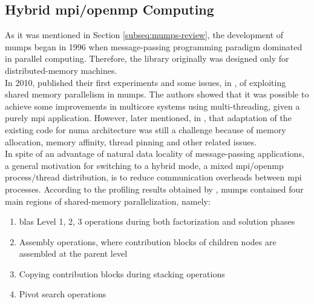\subsection{Hybrid \acrshort{mpi}/\acrshort{openmp} Computing}

\label{subseq:mpi-openmp}


As it was mentioned in Section \ref{subseq:mumps-review}, the development of \acrshort{mumps} began in 1996 when message-passing programming paradigm dominated in parallel computing. Therefore, the library originally was designed only for distributed-memory machines.\\

In 2010,  \citeauthor{chowdhury2010some} published their first experiments and some issues, in \cite{chowdhury2010some}, of exploiting shared memory parallelism in \acrshort{mumps}. The authors showed that it was possible to achieve some improvements in multicore systems using multi-threading, given a purely \acrshort{mpi} application. However, later \citeauthor{l2013introduction} mentioned, in \cite{l2013introduction}, that adaptation of the existing code for \acrshort{numa} architecture was still a challenge because of memory allocation, memory affinity, thread pinning and other related issues.\\


In spite of an advantage of natural data locality of message-passing applications, a general motivation for switching to a hybrid mode, a mixed \acrshort{mpi}/\acrshort{openmp} process/thread distribution, is to reduce communication overheads between \acrshort{mpi} processes. According to the profiling results obtained by \citeauthor{chowdhury2010some}, \acrshort{mumps} contained four main regions of shared-memory parallelization, namely: 

\begin{enumerate}

	\item \acrshort{blas} Level 1, 2, 3 operations during both factorization and solution phases \label{openmp-blocks-1}
	
	\item Assembly operations, where contribution blocks of children nodes are assembled at the parent level \label{openmp-blocks-2}
	
	\item Copying contribution blocks during stacking operations \label{openmp-blocks-3}
	
	\item Pivot search operations \label{openmp-blocks-4}

\end{enumerate}


